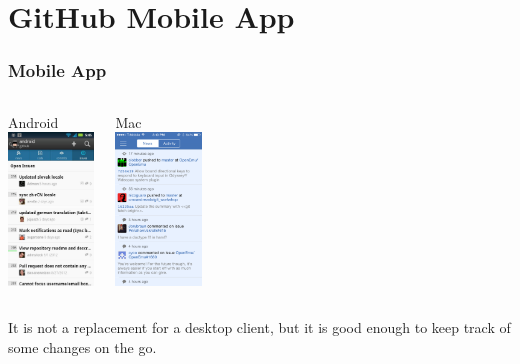 
\section[Mobile App]{GitHub Mobile App}

\begin{frame}
\frametitle{Mobile App}
\begin{columns}[c]
\column{2in}
\begin{center}
Android\\
\vspace{1mm}
\includegraphics[width=0.9in]{img/mobile_android.jpg}
\end{center}
\column{2in}
\begin{center}
Mac\\
\vspace{1mm}
\includegraphics[width=0.9in]{img/mobile_mac.png}
\end{center}
\end{columns}
\vspace{5mm}
\begin{center}
{\small It is not a replacement for a desktop client, but it is good enough to keep track of some changes on the go.}
\end{center}
\end{frame}
\note{}